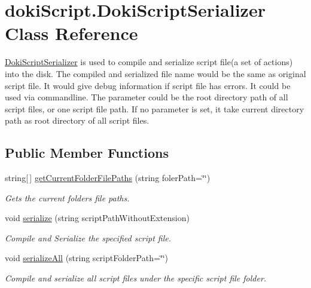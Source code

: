 \hypertarget{classdoki_script_1_1_doki_script_serializer}{}\section{doki\+Script.\+Doki\+Script\+Serializer Class Reference}
\label{classdoki_script_1_1_doki_script_serializer}


\hyperlink{classdoki_script_1_1_doki_script_serializer}{Doki\+Script\+Serializer} is used to compile and serialize script file(a set of actions) into the disk. The compiled and serialized file name would be the same as original script file. It would give debug information if script file has errors. It could be used via commandline. The parameter could be the root directory path of all script files, or one script file path. If no parameter is set, it take current directory path as root directory of all script files.  


\subsection*{Public Member Functions}
\begin{DoxyCompactItemize}
\item 
string\mbox{[}$\,$\mbox{]} \hyperlink{classdoki_script_1_1_doki_script_serializer_a9ab0e1d1f6167d0a4b0fa36e6d256289}{get\+Current\+Folder\+File\+Paths} (string foler\+Path=\char`\"{}\char`\"{})
\begin{DoxyCompactList}\small\item\em Gets the current folder\textquotesingle{}s file paths. \end{DoxyCompactList}\item 
void \hyperlink{classdoki_script_1_1_doki_script_serializer_a9ed7d9738cc4b0eeccb50f92b198ddbb}{serialize} (string script\+Path\+Without\+Extension)
\begin{DoxyCompactList}\small\item\em Compile and Serialize the specified script file. \end{DoxyCompactList}\item 
void \hyperlink{classdoki_script_1_1_doki_script_serializer_ad299276b93f41858859c1c7a29f75cb0}{serialize\+All} (string script\+Folder\+Path=\char`\"{}\char`\"{})
\begin{DoxyCompactList}\small\item\em Compile and serialize all script files under the specific script file folder. \end{DoxyCompactList}\end{DoxyCompactItemize}
